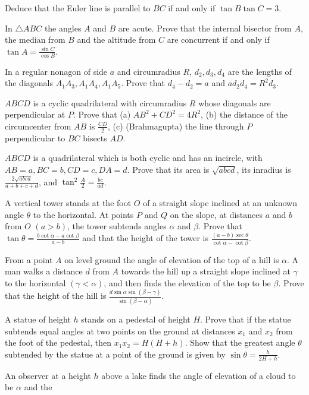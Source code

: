   Deduce that the Euler line is parallel to $BC$ if and only if $\tan B\tan C = 3$.
\item In $\triangle ABC$ the angles $A$ and $B$ are acute. Prove that the internal bisector from $A$, the
  median from $B$ and the altitude from $C$ are concurrent if and only if $\tan A = \frac{\sin C}{\cos B}$.
\item In a regular nonagon of side $a$ and circumradius $R$, $d_2, d_3, d_4$ are the lengths of the diagonals
  $A_1A_3, A_1A_4, A_1A_5$. Prove that $d_4 - d_2 = a$ and $ad_2d_4 = R^2d_3$.
\item $ABCD$ is a cyclic quadrilateral with circumradius $R$ whose diagonals are perpendicular at $P$. Prove
  that (a) $AB^2 + CD^2 = 4R^2$, (b) the distance of the circumcenter from $AB$ is $\frac{CD}{2}$, (c)
  (Brahmagupta) the line through $P$ perpendicular to $BC$ bisects $AD$.
\item $ABCD$ is a quadrilateral which is both cyclic and has an incircle, with $AB = a, BC = b, CD = c, DA =
  d$. Prove that its area is $\sqrt{abcd}$, its inradius is $\frac{2\sqrt{abcd}}{a + b + c + d}$, and
  $\tan^2\frac{A}{2} = \frac{bc}{ad}$.
\item A vertical tower stands at the foot $O$ of a straight slope inclined at an unknown angle $\theta$ to the
  horizontal. At points $P$ and $Q$ on the slope, at distances $a$ and $b$ from $O$ $(a > b)$, the tower
  subtends angles $\alpha$ and $\beta$. Prove that $\tan\theta = \frac{b\cot\alpha - a\cot\beta}{a - b}$ and
  that the height of the tower is $\frac{(a - b)\sec\theta}{\cot\alpha - \cot\beta}$.
\item From a point $A$ on level ground the angle of elevation of the top of a hill is $\alpha$. A man walks
  a distance $d$ from $A$ towards the hill up a straight slope inclined at $\gamma$ to the horizontal $(\gamma
  < \alpha)$, and then finds the elevation of the top to be $\beta$. Prove that the height of the hill is
  $\frac{d\sin\alpha\sin(\beta - \gamma)}{\sin(\beta - \alpha)}$.
\item A statue of height $h$ stands on a pedestal of height $H$. Prove that if the statue subtends equal
  angles at two points on the ground at distances $x_1$ and $x_2$ from the foot of the pedestal, then $x_1x_2
  = H(H + h)$. Show that the greatest angle $\theta$ subtended by the statue at a point of the ground is
  given by $\sin\theta = \frac{h}{2H + h}$.
\item An observer at a height $h$ above a lake finds the angle of elevation of a cloud to be $\alpha$ and the
